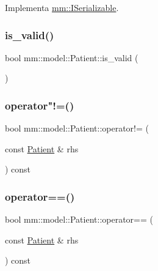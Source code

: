 Implementa \hyperlink{classmm_1_1_i_serializable_a9717e6da47fcbac3ffa2e68152464e0a}{mm\+::\+I\+Serializable}.

\mbox{\label{classmm_1_1model_1_1_patient_a5f9da3f880ef1adc4bc5443ea407f48f}} 
\subsubsection{\texorpdfstring{is\+\_\+valid()}{is\_valid()}}
{\footnotesize\ttfamily bool mm\+::model\+::\+Patient\+::is\+\_\+valid (\begin{DoxyParamCaption}{ }\end{DoxyParamCaption})}

\mbox{\label{classmm_1_1model_1_1_patient_a96fe68d415c82b084ca75e87aefe8314}} 
\subsubsection{\texorpdfstring{operator"!=()}{operator!=()}}
{\footnotesize\ttfamily bool mm\+::model\+::\+Patient\+::operator!= (\begin{DoxyParamCaption}\item[{const \hyperlink{classmm_1_1model_1_1_patient}{Patient} \&}]{rhs }\end{DoxyParamCaption}) const}

\mbox{\label{classmm_1_1model_1_1_patient_a69367747ebc66b1b4e2fdf961811d83d}} 
\subsubsection{\texorpdfstring{operator==()}{operator==()}}
{\footnotesize\ttfamily bool mm\+::model\+::\+Patient\+::operator== (\begin{DoxyParamCaption}\item[{const \hyperlink{classmm_1_1model_1_1_patient}{Patient} \&}]{rhs }\end{DoxyParamCaption}) const}


